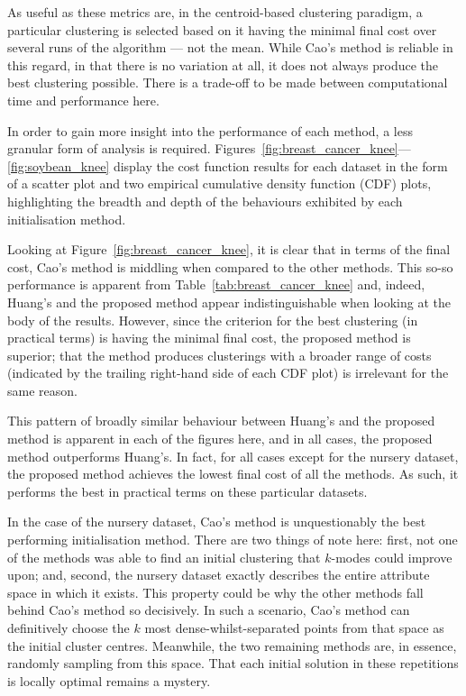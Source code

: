 As useful as these metrics are, in the centroid-based clustering paradigm, a
particular clustering is selected based on it having the minimal final cost over
several runs of the algorithm --- not the mean. While Cao's method is reliable
in this regard, in that there is no variation at all, it does not always produce
the best clustering possible. There is a trade-off to be made between
computational time and performance here.

In order to gain more insight into the performance of each method, a less
granular form of analysis is required.
Figures~\ref{fig:breast_cancer_knee}---\ref{fig:soybean_knee} display the cost
function results for each dataset in the form of a scatter plot and two
empirical cumulative density function (CDF) plots, highlighting the breadth and
depth of the behaviours exhibited by each initialisation method.

Looking at Figure~\ref{fig:breast_cancer_knee}, it is clear that in terms of the
final cost, Cao's method is middling when compared to the other methods. This
so-so performance is apparent from Table~\ref{tab:breast_cancer_knee} and,
indeed, Huang's and the proposed method appear indistinguishable when looking at
the body of the results. However, since the criterion for the best clustering
(in practical terms) is having the minimal final cost, the proposed method is
superior; that the method produces clusterings with a broader range of costs
(indicated by the trailing right-hand side of each CDF plot) is irrelevant for
the same reason.

This pattern of broadly similar behaviour between Huang's and the proposed
method is apparent in each of the figures here, and in all cases, the proposed
method outperforms Huang's. In fact, for all cases except for the nursery
dataset, the proposed method achieves the lowest final cost of all the methods.
As such, it performs the best in practical terms on these particular datasets.

In the case of the nursery dataset, Cao's method is unquestionably the best
performing initialisation method. There are two things of note here: first, not
one of the methods was able to find an initial clustering that \(k\)-modes could
improve upon; and, second, the nursery dataset exactly describes the entire
attribute space in which it exists. This property could be why the other methods
fall behind Cao's method so decisively. In such a scenario, Cao's method can
definitively choose the \(k\) most dense-whilst-separated points from that
space as the initial cluster centres. Meanwhile, the two remaining methods are,
in essence, randomly sampling from this space. That each initial solution in
these repetitions is locally optimal remains a mystery.

